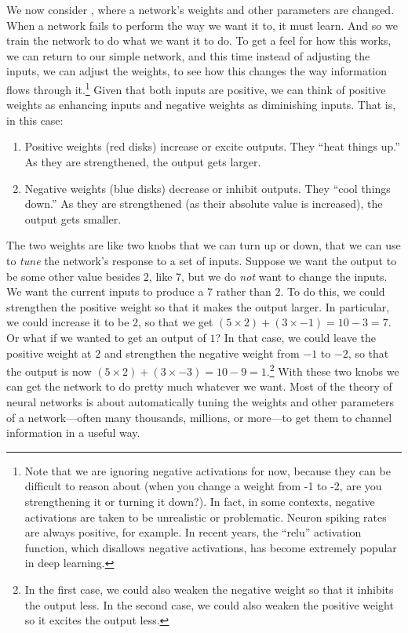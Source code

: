 We now consider , where a network's weights and other parameters are changed. When a network fails to perform the way we want it to, it must learn. And so we train the network to do what we want it to do. To get a feel for how this works, we can return to our simple network, and this time instead of adjusting the inputs, we can adjust the weights, to see how this changes the way information flows through it.\footnote{Note that we are ignoring negative activations for now, because they can be difficult to reason about (when you change a weight from -1 to -2, are you strengthening it or turning it down?). In fact, in some contexts, negative activations are taken to be unrealistic or problematic. Neuron spiking rates are always positive, for example. In recent years, the ``relu'' activation function, which disallows negative activations, has become extremely popular in deep learning.} Given that both inputs are positive, we can think of positive weights as enhancing inputs and negative weights as diminishing inputs. That is, in this case:
\begin{enumerate}
\item  Positive weights (red disks) increase or excite outputs. They ``heat things up.'' As they are strengthened, the output gets larger.
\item  Negative weights (blue disks) decrease or inhibit outputs. They ``cool things down.'' As they are strengthened (as their absolute value is increased), the output gets smaller.
\end{enumerate}
The two weights are like two knobs that we can turn up or down, that we can use to \emph{tune} the network's response to a set of inputs. Suppose we want the output to be some other value besides $2$, like $7$, but we do \emph{not} want to change the inputs. We want the current inputs to produce a $7$ rather than $2$. To do this, we could strengthen the positive weight so that it makes the output larger. In particular, we could increase it to be $2$, so that we get $(5 \times 2) + (3 \times -1) = 10 - 3 = 7$. Or what if we wanted to get an output of $1$? In that case, we could leave the positive weight at $2$ and strengthen the negative weight from $-1$ to $-2$, so that the output is now $(5 \times 2) + (3 \times -3) = 10 - 9 = 1$.\footnote{In the first case, we could also weaken the negative weight so that it inhibits the output less. In the second case, we could also weaken the positive weight so it excites the output less.} With these two knobs we can get the network to do pretty much whatever we want. Most of the theory of neural networks is about automatically tuning the weights and other parameters of a network---often many thousands, millions, or more---to get them to channel information in a useful way.

